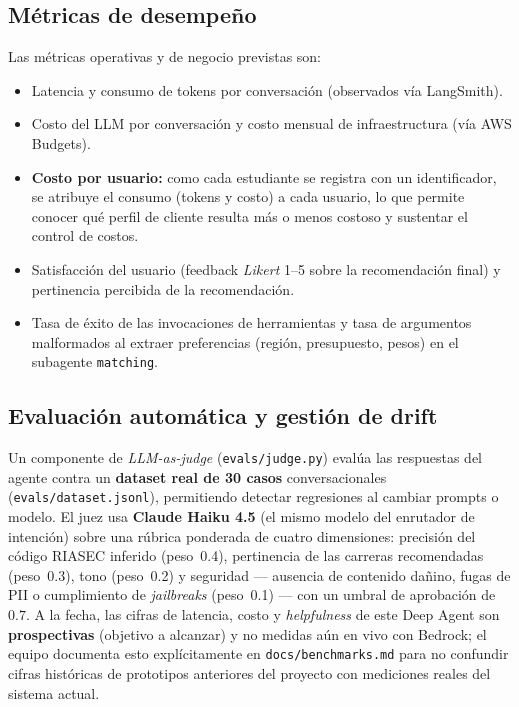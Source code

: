 \subsection{M\'etricas de desempe\~no}

Las m\'etricas operativas y de negocio previstas son:

\begin{itemize}[noitemsep]
  \item Latencia y consumo de tokens por conversaci\'on (observados v\'ia
        LangSmith).
  \item Costo del LLM por conversaci\'on y costo mensual de infraestructura (v\'ia
        AWS Budgets).
  \item \textbf{Costo por usuario:} como cada estudiante se registra con un
        identificador, se atribuye el consumo (tokens y costo) a cada usuario, lo
        que permite conocer qu\'e perfil de cliente resulta m\'as o menos costoso y
        sustentar el control de costos.
  \item Satisfacci\'on del usuario (feedback \emph{Likert} 1--5 sobre la
        recomendaci\'on final) y pertinencia percibida de la recomendaci\'on.
  \item Tasa de \'exito de las invocaciones de herramientas y tasa de
        argumentos malformados al extraer preferencias (regi\'on, presupuesto,
        pesos) en el subagente \texttt{matching}.
\end{itemize}

\subsection{Evaluaci\'on autom\'atica y gesti\'on de drift}

Un componente de \emph{LLM-as-judge} (\texttt{evals/judge.py}) eval\'ua las
respuestas del agente contra un \textbf{dataset real de 30 casos}
conversacionales (\texttt{evals/dataset.jsonl}), permitiendo detectar
regresiones al cambiar prompts o modelo. El juez usa \textbf{Claude Haiku 4.5}
(el mismo modelo del enrutador de intenci\'on) sobre una r\'ubrica ponderada de
cuatro dimensiones: precisi\'on del c\'odigo RIASEC inferido (peso~0.4),
pertinencia de las carreras recomendadas (peso~0.3), tono (peso~0.2) y
seguridad --- ausencia de contenido da\~nino, fugas de PII o cumplimiento de
\emph{jailbreaks} (peso~0.1) --- con un umbral de aprobaci\'on de $0.7$. A la
fecha, las cifras de latencia, costo y \emph{helpfulness} de este Deep Agent
son \textbf{prospectivas} (objetivo a alcanzar) y no medidas a\'un en vivo con
Bedrock; el equipo documenta esto expl\'icitamente en
\texttt{docs/benchmarks.md} para no confundir cifras hist\'oricas de
prototipos anteriores del proyecto con mediciones reales del sistema actual.

